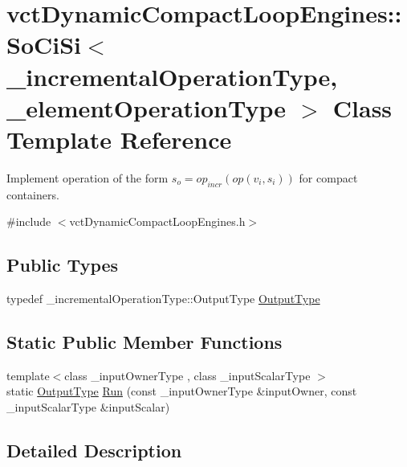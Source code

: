 \hypertarget{classvct_dynamic_compact_loop_engines_1_1_so_ci_si}{}\section{vct\+Dynamic\+Compact\+Loop\+Engines\+:\+:So\+Ci\+Si$<$ \+\_\+incremental\+Operation\+Type, \+\_\+element\+Operation\+Type $>$ Class Template Reference}
\label{classvct_dynamic_compact_loop_engines_1_1_so_ci_si}


Implement operation of the form $s_o = op_{incr}(op(v_i, s_i))$ for compact containers.  




{\ttfamily \#include $<$vct\+Dynamic\+Compact\+Loop\+Engines.\+h$>$}

\subsection*{Public Types}
\begin{DoxyCompactItemize}
\item 
typedef \+\_\+incremental\+Operation\+Type\+::\+Output\+Type \hyperlink{classvct_dynamic_compact_loop_engines_1_1_so_ci_si_a2a36b75e6bf3d9b8dd1db23d5e5f8453}{Output\+Type}
\end{DoxyCompactItemize}
\subsection*{Static Public Member Functions}
\begin{DoxyCompactItemize}
\item 
{\footnotesize template$<$class \+\_\+input\+Owner\+Type , class \+\_\+input\+Scalar\+Type $>$ }\\static \hyperlink{classvct_dynamic_compact_loop_engines_1_1_so_ci_si_a2a36b75e6bf3d9b8dd1db23d5e5f8453}{Output\+Type} \hyperlink{classvct_dynamic_compact_loop_engines_1_1_so_ci_si_a69811ed93c34489c3c2bbbe2bac9d34d}{Run} (const \+\_\+input\+Owner\+Type \&input\+Owner, const \+\_\+input\+Scalar\+Type \&input\+Scalar)
\end{DoxyCompactItemize}


\subsection{Detailed Description}
